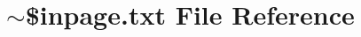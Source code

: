\hypertarget{~_0Binpage_8txt}{}\section{$\sim$\$inpage.\+txt File Reference}
\label{~_0Binpage_8txt}
